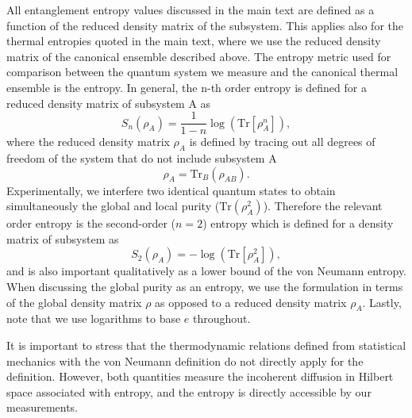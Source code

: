 All entanglement entropy values discussed in the main text are defined as a function of the reduced density matrix of the subsystem. This applies also for the thermal entropies quoted in the main text, where we use the reduced density matrix of the canonical ensemble described above. The entropy metric used for comparison between the quantum system we measure and the canonical thermal ensemble is the \Renyi entropy. In general, the n-th order \Renyi entropy is defined for a reduced density matrix of subsystem A as
\[
S_{n}(\rho_{A})=\frac{1}{1-n}\log{(\mathrm{Tr}[\rho_{A}^n])},
\]
where the reduced density matrix $\rho_{A}$ is defined by tracing out all degrees of freedom of the system that do not include subsystem A
\[
\rho_{A}=\mathrm{Tr}_{B} (\rho_{AB}).
\]
Experimentally, we interfere two identical quantum states to obtain simultaneously the global and local purity ($\mathrm{Tr}(\rho_{A}^2)$). Therefore the relevant order \Renyi entropy is the second-order ($n=2$) \Renyi entropy which is defined for a density matrix of subsystem as
\[
S_{2}(\rho_{A})=-\log{(\mathrm{Tr}[\rho_{A}^2])},
\]
and is also important qualitatively as a lower bound of the von Neumann entropy.  When discussing the global purity as an entropy, we use the \Renyi formulation in terms of the global density matrix $\rho$ as opposed to a reduced density matrix $\rho_A$. Lastly, note that we use logarithms to base $e$ throughout. 

It is important to stress that the thermodynamic relations defined from statistical mechanics with the von Neumann definition do not directly apply for the \Renyi definition. However, both quantities measure the incoherent diffusion in Hilbert space associated with entropy, and the \Renyi entropy is directly accessible by our measurements.  
